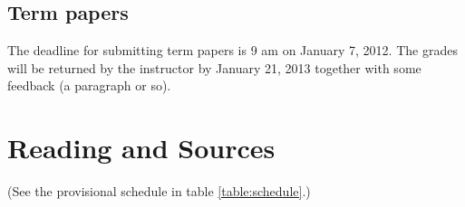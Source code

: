 \documentclass[12pt,\papersize]{extarticle}
\begin{document}
\subsection{Term papers}
The deadline for submitting term papers is 9 am on January 7, 2012. The grades will be returned by the instructor by January 21, 2013 together with some feedback (a paragraph or so).



\section{Reading and Sources}

(See the provisional schedule in table \vref{table:schedule}.)

{
	\def\section*#1{}	%
	
}
\end{document}
